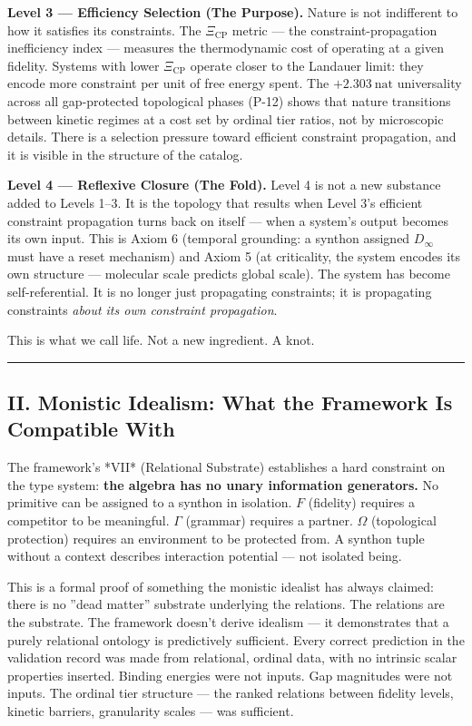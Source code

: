 \documentclass[12pt,a4paper]{article}
\begin{document}
\textbf{Level 3 --- Efficiency Selection (The Purpose).} Nature is not indifferent to how it satisfies its constraints. The $\Xi_\text{CP}$ metric --- the constraint-propagation inefficiency index --- measures the thermodynamic cost of operating at a given fidelity. Systems with lower $\Xi_\text{CP}$ operate closer to the Landauer limit: they encode more constraint per unit of free energy spent. The $+2.303\ \text{nat}$ universality across all gap-protected topological phases (P-12) shows that nature transitions between kinetic regimes at a cost set by ordinal tier ratios, not by microscopic details. There is a selection pressure toward efficient constraint propagation, and it is visible in the structure of the catalog.

\textbf{Level 4 --- Reflexive Closure (The Fold).} Level 4 is not a new substance added to Levels 1--3. It is the topology that results when Level 3's efficient constraint propagation turns back on itself --- when a system's output becomes its own input. This is Axiom 6 (temporal grounding: a synthon assigned $D_\infty$ must have a reset mechanism) and Axiom 5 (at criticality, the system encodes its own structure --- molecular scale predicts global scale). The system has become self-referential. It is no longer just propagating constraints; it is propagating constraints \emph{about its own constraint propagation}.

This is what we call life. Not a new ingredient. A knot.

\begin{center}
\rule{0.5\textwidth}{0.4pt}
\end{center}

\subsection{II. Monistic Idealism: What the Framework Is Compatible With}

The framework's *VII* (Relational Substrate) establishes a hard constraint on the type system: \textbf{the algebra has no unary information generators.} No primitive can be assigned to a synthon in isolation. $F$ (fidelity) requires a competitor to be meaningful. $\Gamma$ (grammar) requires a partner. $\Omega$ (topological protection) requires an environment to be protected from. A synthon tuple without a context describes interaction potential --- not isolated being.

This is a formal proof of something the monistic idealist has always claimed: there is no ''dead matter'' substrate underlying the relations. The relations are the substrate. The framework doesn't derive idealism --- it demonstrates that a purely relational ontology is predictively sufficient. Every correct prediction in the validation record was made from relational, ordinal data, with no intrinsic scalar properties inserted. Binding energies were not inputs. Gap magnitudes were not inputs. The ordinal tier structure --- the ranked relations between fidelity levels, kinetic barriers, granularity scales --- was sufficient.
\end{document}
